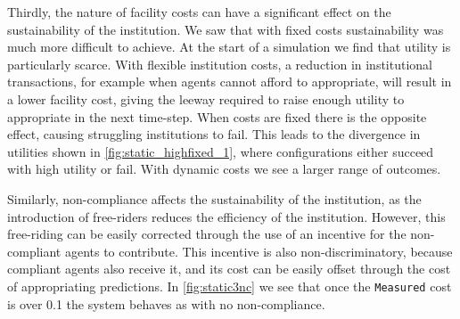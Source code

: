 Thirdly, the nature of facility costs can have a significant effect on the
sustainability of the institution. We saw that with fixed costs sustainability
was much more difficult to achieve. At the start of a simulation we find that
utility is particularly scarce. With flexible institution costs, a reduction
in institutional transactions, for example when agents cannot afford to
appropriate, will result in a lower facility cost, giving the leeway required
to raise enough utility to appropriate in the next time-step. When costs are
fixed there is the opposite effect, causing struggling institutions to fail.
This leads to the divergence in utilities shown in
\autoref{fig:static_highfixed_1}, where configurations either succeed with
high utility or fail. With dynamic costs we see a larger range of outcomes.

Similarly, non-compliance affects the sustainability of the institution, as
the introduction of free-riders reduces the efficiency of the institution.
However, this free-riding can be easily corrected through the use of an
incentive for the non-compliant agents to contribute. This incentive is also
non-discriminatory, because compliant agents also receive it, and its cost can
be easily offset through the cost of appropriating predictions. In
\autoref{fig:static3nc} we see that once the \texttt{Measured} cost is over
0.1 the system behaves as with no non-compliance.





